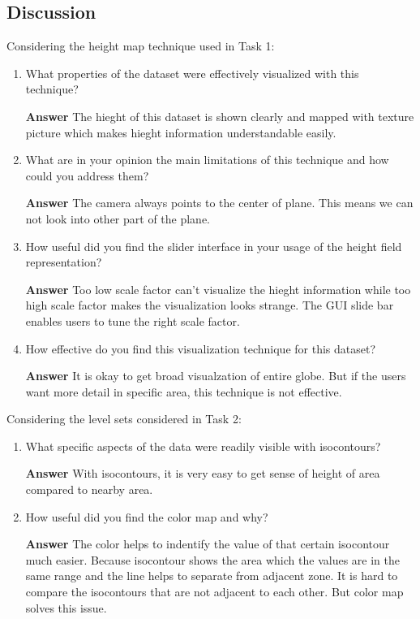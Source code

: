 \documentclass[11pt]{article}
\begin{document}
\subsection*{Discussion}

\noindent Considering the height map technique used in Task 1:

\begin{enumerate}[label=\arabic*.]

\item What properties of the dataset were effectively visualized with this technique?

\noindent\textbf{Answer} The hieght of this dataset is shown clearly and mapped with texture picture which makes hieght information understandable easily.

\item What are in your opinion the main limitations of this technique and how could you address them?

\noindent\textbf{Answer} The camera always points to the center of plane. This means we can not look into other part of the plane.

\item How useful did you find the slider interface in your usage of the height field representation?

\noindent\textbf{Answer} Too low scale factor can't visualize the hieght information while too high scale factor makes the visualization looks strange. The GUI slide bar enables users to tune the right scale factor.

\item How effective do you find this visualization technique for this dataset?

\noindent\textbf{Answer} It is okay to get broad visualzation of entire globe. But if the users want more detail in specific area, this technique is not effective.

\end{enumerate}

\noindent Considering the level sets considered in Task 2:

\begin{enumerate}[label=\arabic*.]

\item What specific aspects of the data were readily visible with isocontours?

\noindent\textbf{Answer} With isocontours, it is very easy to get sense of height of area compared to nearby area.

\item How useful did you find the color map and why?

\noindent\textbf{Answer} The color helps to indentify the value of that certain isocontour much easier. 
Because isocontour shows the area which the values are in the same range and the line helps to separate from adjacent zone.
It is hard to compare the isocontours that are not adjacent to each other. But color map solves this issue.

\end{enumerate}
\end{document}
